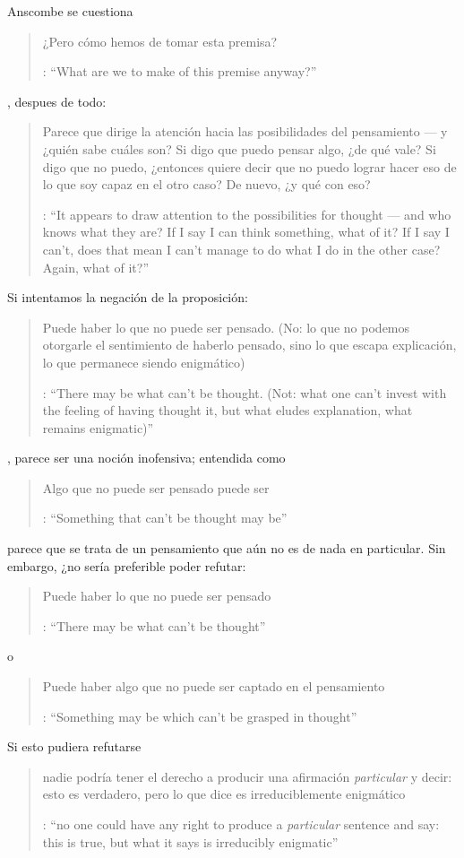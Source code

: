 Anscombe se cuestiona \blockquote[{\cite[7]{anscombe1981parmenides:pmc}}: \enquote{What are we to make of this premise anyway?}]{¿Pero cómo hemos de tomar esta premisa?}, despues de todo: \blockquote[{\cite[7]{anscombe1981parmenides:pmc}}: \enquote{It appears to draw attention to the possibilities for thought --- and who knows what they are? If I say I can think something, what of it? If I say I can't, does that mean I can't manage to do what I do in the other case? Again, what of it?}]{Parece que dirige la atención hacia las posibilidades del pensamiento --- y ¿quién sabe cuáles son? Si digo que puedo pensar algo, ¿de qué vale? Si digo que no puedo, ¿entonces quiere decir que no puedo lograr hacer eso de lo que soy capaz en el otro caso? De nuevo, ¿y qué con eso?}. Si intentamos la negación de la proposición: \blockquote[{\cite[7]{anscombe1981parmenides:pmc}}: \enquote{There may be what can't be thought. (Not: what one can't invest with the feeling of having thought it, but what eludes explanation, what remains enigmatic)}]{Puede haber lo que no puede ser pensado. (No: lo que no podemos otorgarle el sentimiento de haberlo pensado, sino lo que escapa explicación, lo que permanece siendo enigmático)}, parece ser una noción inofensiva; entendida como \blockquote[{\cite[7]{anscombe1981parmenides:pmc}}: \enquote{Something that can't be thought may be}]{Algo que no puede ser pensado puede ser} parece que se trata de un pensamiento que aún no es de nada en particular. Sin embargo, ¿no sería preferible poder refutar: \blockquote[{\cite[7]{anscombe1981parmenides:pmc}}: \enquote{There may be what can't be thought}]{Puede haber lo que no puede ser pensado} o \blockquote[{\cite[7]{anscombe1981parmenides:pmc}}: \enquote{Something may be which can't be grasped in thought}]{Puede haber algo que no puede ser captado en el pensamiento}? Si esto pudiera refutarse \blockquote[{\cite[7]{anscombe1981parmenides:pmc}}: \enquote{no one could have any right to produce a \emph{particular} sentence and say: this is true, but what it says is irreducibly enigmatic}]{nadie podría tener el derecho a producir una afirmación \emph{particular} y decir: esto es verdadero, pero lo que dice es irreduciblemente enigmático}.

